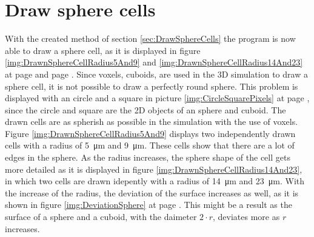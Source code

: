 \section{Draw sphere cells}
With the created method of section \ref{sec:DrawSphereCells} the program is now able to draw a sphere cell, as it is displayed in figure \ref{img:DrawnSphereCellRadius5And9} and \ref{img:DrawnSphereCellRadius14And23} at page \pageref{img:DrawnSphereCellRadius5And9} and page \pageref{img:DrawnSphereCellRadius14And23}. \newline
Since voxels, cuboids, are used in the 3D simulation to draw a sphere cell, it is not possible to draw a perfectly round sphere. This problem is displayed with an circle and a square in picture \ref{img:CircleSquarePixels} at page \pageref{img:CircleSquarePixels}, since the circle and square are the 2D objects of an sphere and cuboid. The drawn cells are as spherish as possible in the simulation with the use of voxels. \newline
Figure \ref{img:DrawnSphereCellRadius5And9} displays two independently drawn cells with a radius of \SI{5}{\micro\metre} and \SI{9}{\micro\metre}. These cells show that there are a lot of edges in the sphere. As the radius increases, the sphere shape of the cell gets more detailed as it is displayed in figure \ref{img:DrawnSphereCellRadius14And23}, in which two cells are drawn idepently with a radius of \SI{14}{\micro\metre} and \SI{23}{\micro\metre}. With the increase of the radius, the deviation of the surface increases as well, as it is shown in figure \ref{img:DeviationSphere} at page \pageref{img:DeviationSphere}. This might be a result as the surface of a sphere and a cuboid, with the daimeter $2 \cdot r$, deviates more as $r$ increases.

